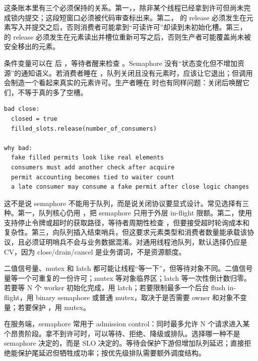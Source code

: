 这条账本里有三个必须保持的关系。第一，，除非某个线程已经拿到许可但尚未完成锁内提交；这段短窗口必须被代码审查标出来。第二， 的 release 必须发生在元素写入并提交之后，否则消费者可能拿到“可读许可”却读到未初始化槽。第三， 的 release 必须发生在元素读出并槽位重新可写之后，否则生产者可能覆盖尚未被安全移出的元素。

条件变量可以在  后 ，等待者醒来检查 。Semaphore 没有“状态变化但不增加资源”的通知语义。若消费者睡在 ，队列关闭且没有元素时，应该让它退出；但调用  会制造一个看起来真实的元素许可。生产者睡在  时也有同样问题：关闭后唤醒它们，不等于真的多了空槽。

\begin{lstlisting}[numbers=none,caption={semaphore 队列关闭时最容易写错的地方}]
bad close:
  closed = true
  filled_slots.release(number_of_consumers)

why bad:
  fake filled permits look like real elements
  consumers must add another check after acquire
  permit accounting becomes tied to waiter count
  a late consumer may consume a fake permit after close logic changes
\end{lstlisting}

这不是说 semaphore 不能用于队列，而是说关闭协议要显式设计。常见选择有三种。第一，队列核心仍用 ，把 semaphore 只用于外层 in-flight 限额。第二，使用支持停止令牌或超时的获取路径，等待者周期性检查 ，但要接受超时轮询成本和复杂性。第三，向队列插入结束哨兵，但这要求元素类型和消费者数量能承载该协议，且必须证明哨兵不会与业务数据混淆。对通用线程池队列，默认选择仍应是 CV，因为 close/drain/cancel 是业务谓词，不是资源额度。

二值信号量、mutex 和 latch 都可能让线程“等一下”，但等待对象不同。二值信号量等一个可重复的一份许可；mutex 等对象临界区；latch 等一次性倒计数归零。若要等 N 个 worker 初始化完成，用 latch；若要限制最多一个后台 flush in-flight，用 binary semaphore 或普通 mutex，取决于是否需要 owner 和对象不变量；若要保护 ，用 mutex。

在服务端，semaphore 常用于 admission control：同时最多允许 N 个请求进入某个昂贵阶段。拿不到许可时，可以等待、拒绝、降级或排队。选择哪一种不是 semaphore 决定的，而是 SLO 决定的。等待会保护下游但增加队列延迟；直接拒绝能保护尾延迟但牺牲成功率；按优先级排队需要额外调度结构。

